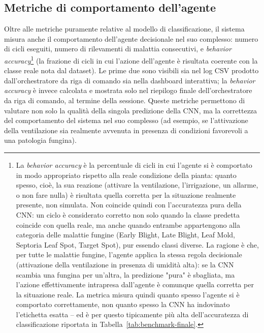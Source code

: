 \subsection{Metriche di comportamento dell'agente}

Oltre alle metriche puramente relative al modello di classificazione, il
sistema misura anche il comportamento dell'agente decisionale nel suo
complesso: numero di cicli eseguiti, numero di rilevamenti di malattia
consecutivi, e \emph{behavior accuracy}\footnote{La \emph{behavior
accuracy} è la percentuale di cicli in cui l'agente si è comportato in
modo appropriato rispetto alla reale condizione della pianta: quanto
spesso, cioè, la sua reazione (attivare la ventilazione, l'irrigazione,
un allarme, o non fare nulla) è risultata quella corretta per la
situazione realmente presente, non simulata. Non coincide quindi con
l'accuratezza pura della CNN: un ciclo è considerato corretto non solo
quando la classe predetta coincide con quella reale, ma anche quando
entrambe appartengono alla categoria delle malattie fungine (Early
Blight, Late Blight, Leaf Mold, Septoria Leaf Spot, Target Spot), pur
essendo classi diverse. La ragione è che, per tutte le malattie fungine,
l'agente applica la stessa regola decisionale (attivazione della
ventilazione in presenza di umidità alta): se la CNN scambia una fungina
per un'altra, la predizione "pura" è sbagliata, ma l'azione
effettivamente intrapresa dall'agente è comunque quella corretta per la
situazione reale. La metrica misura quindi quanto spesso l'agente si è
comportato correttamente, non quanto spesso la CNN ha indovinato
l'etichetta esatta -- ed è per questo tipicamente più alta
dell'accuratezza di classificazione riportata in
Tabella~\ref{tab:benchmark-finale}.} (la frazione di cicli in cui l'azione
dell'agente è risultata coerente con la classe reale nota dal dataset). Le
prime due
sono visibili sia nel log CSV prodotto dall'orchestratore da riga di
comando sia nella dashboard interattiva; la \emph{behavior accuracy} è
invece calcolata e mostrata solo nel riepilogo finale dell'orchestratore da
riga di comando, al termine della sessione. Queste metriche permettono di
valutare non solo la qualità della singola predizione della CNN, ma la
correttezza del comportamento del sistema nel suo complesso (ad esempio, se
l'attivazione della ventilazione sia realmente avvenuta in presenza di
condizioni favorevoli a una patologia fungina).
